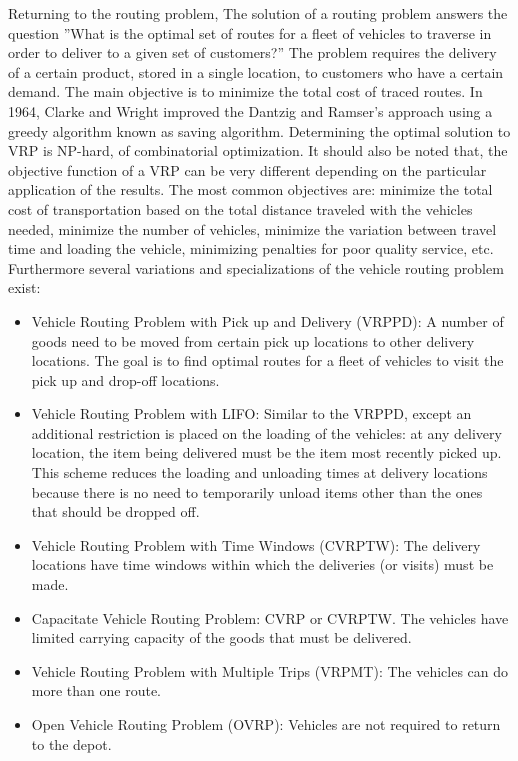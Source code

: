 Returning to the routing problem, 
The solution of a routing problem answers the question ''What is the optimal set of routes for a fleet of vehicles to traverse in order to deliver to a given set of customers?''
The problem requires the delivery of a certain product, stored in a single location,
to customers who have a certain demand. The main objective is to minimize the
total cost of traced routes. In 1964, Clarke and Wright improved the Dantzig and Ramser's approach using a greedy algorithm known as saving algorithm. Determining the optimal solution to VRP is NP-hard, of combinatorial optimization. It should also be noted that, the objective function of
a VRP can be very different depending on the particular application of the results. The most common objectives are: minimize the total cost of transportation based on the total distance traveled with the vehicles needed, minimize the number of vehicles, minimize the variation between travel time and
loading the vehicle, minimizing penalties for poor quality service, etc. Furthermore several variations and specializations of the vehicle routing problem exist:

\begin{itemize}
	\item Vehicle Routing Problem with Pick up and Delivery (VRPPD): A number of goods need to be moved from certain pick up locations to other delivery locations. The goal is to find optimal routes for a fleet of vehicles to visit the pick up and drop-off locations.
	\item Vehicle Routing Problem with LIFO: Similar to the VRPPD, except an additional restriction is placed on the loading of the vehicles: at any delivery location, the item being delivered must be the item most recently picked up. This scheme reduces the loading and unloading times at delivery locations because there is no need to temporarily unload items other than the ones that should be dropped off.
	\item Vehicle Routing Problem with Time Windows (CVRPTW): The delivery locations have time windows within which the deliveries (or visits) must be made.
	\item Capacitate Vehicle Routing Problem: CVRP or CVRPTW. The vehicles have limited carrying capacity of the goods that must be delivered.
	\item Vehicle Routing Problem with Multiple Trips (VRPMT): The vehicles can do more than one route.
	\item Open Vehicle Routing Problem (OVRP): Vehicles are not required to return to the depot.
\end{itemize}


